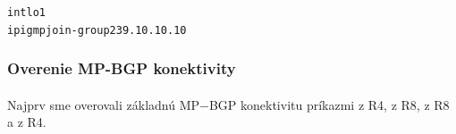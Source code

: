 \documentclass[12pt,twoside,a4paper]{report}
\begin{document}
\noindent
{\selectfont
\begin{small}
\begin{alltt}
int lo1
  ip igmp join-group 239.10.10.10
\end{alltt}
\end{small}
}





\subsubsection{Overenie MP-BGP konektivity}
\paragraph{}
Najprv sme overovali základnú MP−BGP konektivitu príkazmi  z R4,  z R8,  z R8 a  z R4.
\end{document}
